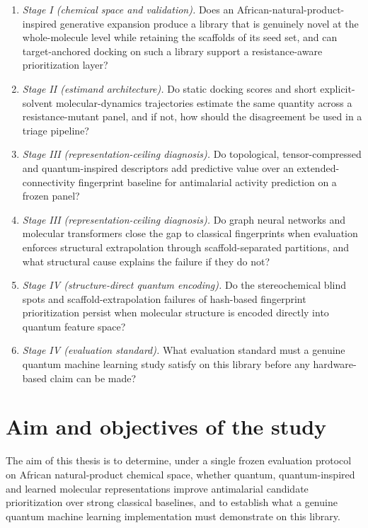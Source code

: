 \begin{enumerate}
	\item \emph{Stage I (chemical space and validation).} Does an African-natural-product-inspired generative expansion produce a library that is genuinely novel at the whole-molecule level while retaining the scaffolds of its seed set, and can target-anchored docking on such a library support a resistance-aware prioritization layer?
	\item \emph{Stage II (estimand architecture).} Do static docking scores and short explicit-solvent molecular-dynamics trajectories estimate the same quantity across a resistance-mutant panel, and if not, how should the disagreement be used in a triage pipeline?
	\item \emph{Stage III (representation-ceiling diagnosis).} Do topological, tensor-compressed and quantum-inspired descriptors add predictive value over an extended-connectivity fingerprint baseline for antimalarial activity prediction on a frozen panel?
	\item \emph{Stage III (representation-ceiling diagnosis).} Do graph neural networks and molecular transformers close the gap to classical fingerprints when evaluation enforces structural extrapolation through scaffold-separated partitions, and what structural cause explains the failure if they do not?
	\item \emph{Stage IV (structure-direct quantum encoding).} Do the stereochemical blind spots and scaffold-extrapolation failures of hash-based fingerprint prioritization persist when molecular structure is encoded directly into quantum feature space?
	\item \emph{Stage IV (evaluation standard).} What evaluation standard must a genuine quantum machine learning study satisfy on this library before any hardware-based claim can be made?
\end{enumerate}

\section*{Aim and objectives of the study}

The aim of this thesis is to determine, under a single frozen evaluation protocol on African natural-product chemical space, whether quantum, quantum-inspired and learned molecular representations improve antimalarial candidate prioritization over strong classical baselines, and to establish what a genuine quantum machine learning implementation must demonstrate on this library.

